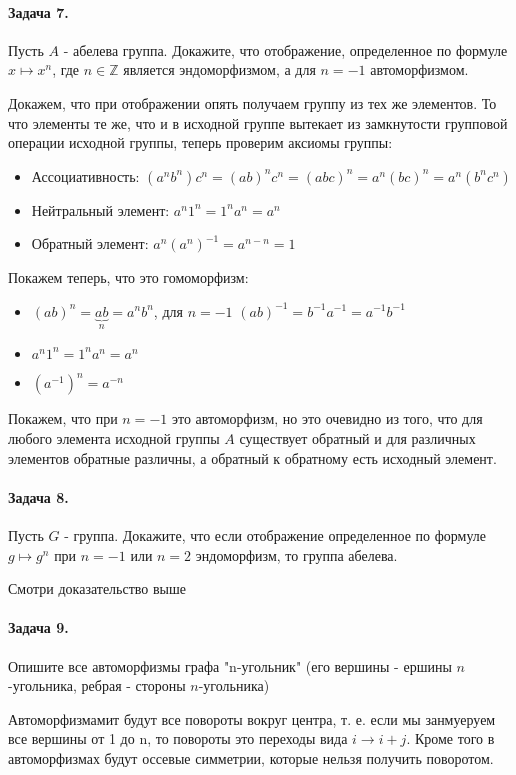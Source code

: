 \documentclass[a4paper,12pt]{article}
\begin{document}
\paragraph{Задача 7.} Пусть $A$ - абелева группа. Докажите, что отображение, определенное по формуле $x \mapsto x^n$, где $n \in \mathbb{Z}$ является эндоморфизмом, а для $n=-1$ автоморфизмом.
\begin{Solution}
Докажем, что при отображении опять получаем группу из тех же элементов. То что элементы те же, что и в исходной группе вытекает из замкнутости групповой операции исходной группы, теперь проверим аксиомы группы:
\begin{itemize}
\item Ассоциативность: $\left(a^nb^n\right)c^n = {\left(ab\right)}^nc^n = {\left(abc\right)}^n = a^n \left(bc\right)^n = a^n \left(b^nc^n\right)$

\item Нейтральный элемент: $a^n1^n=1^na^n=a^n$

\item Обратный элемент: $a^n {\left(a^n\right)}^{-1} = a^{n-n} = 1$
\end{itemize}
Покажем теперь, что это гомоморфизм:
\begin{itemize}
\item ${\left(ab\right)}^n = \underbrace{ab}_n = a^nb^n$, для $n=-1$ ${\left(ab\right)}^{-1} = b^{-1}a^{-1} = a^{-1}b^{-1}$

\item $a^n1^n=1^na^n=a^n$

\item ${\left(a^{-1}\right)}^n = a^{-n}$
\end{itemize}
Покажем, что при $n=-1$ это автоморфизм, но это очевидно из того, что для любого элемента исходной группы $A$ существует обратный и для различных элементов обратные различны, а обратный к обратному есть исходный элемент.
\end{Solution}

\paragraph{Задача 8.} Пусть $G$ - группа. Докажите, что если отображение определенное по формуле $g \mapsto g^n$ при $n=-1$ или $n=2$ эндоморфизм, то группа абелева.

\begin{Solution}
Смотри доказательство выше
\end{Solution}

\paragraph{Задача 9.} Опишите все автоморфизмы графа "n-угольник" (его вершины - ершины $n$-угольника, ребрая - стороны $n$-угольника)
\begin{Solution}
Автоморфизмамит будут все повороты вокруг центра, т. е. если мы занмуеруем все вершины от 1 до n, то повороты это переходы вида $i \rightarrow i+j$. Кроме того в автоморфизмах будут оссевые симметрии, которые нельзя получить поворотом.
\end{Solution}
\end{document}
